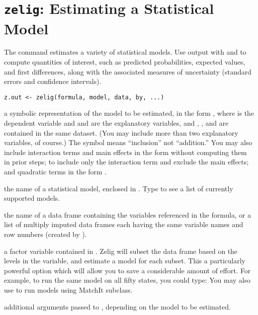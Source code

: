  \section{{\tt zelig}: Estimating a Statistical Model}\label{ss:zelig}
\begin{Description}\relax
The  command estimates a variety of statistical
models.  Use  output with  and  to compute
quantities of interest, such as predicted probabilities, expected values, and
first differences, along with the associated measures of uncertainty
(standard errors and confidence intervals).
\end{Description}
\begin{Usage}
\begin{verbatim}
z.out <- zelig(formula, model, data, by, ...) 
\end{verbatim}
\end{Usage}
\begin{Arguments}
\begin{ldescription}
\item[\code{formula}] a symbolic representation of the model to be
estimated, in the form , where  is the
dependent variable and  and  are the explanatory
variables, and , , and  are contained in the
same dataset.  (You may include more than two explanatory variables,
of course.)  The \code{+} symbol means ``inclusion'' not
``addition.''  You may also include interaction terms and main
effects in the form  without computing them in prior
steps;  to include only the interaction term and
exclude the main effects; and quadratic terms in the form
.  
\item[\code{model}] the name of a statistical model, enclosed in .
Type  to see a list of currently supported
models.  
\item[\code{data}] the name of a data frame containing the variables
referenced in the formula, or a list of multiply imputed data frames
each having the same variable names and row numbers (created by ). 
\item[\code{by}] a factor variable contained in .  Zelig will subset
the data frame based on the levels in the  variable, and
estimate a model for each subset.  This a particularly powerful option
which will allow you to save a considerable amount of effort.  For
example, to run the same model on all fifty states, you could type:
You may also use  to run models using MatchIt subclass.  
\item[\code{...}] additional arguments passed to ,
depending on the model to be estimated. 
\end{ldescription}
\end{Arguments}
